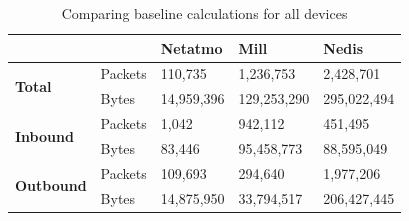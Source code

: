 \begin{table}[H]
    \centering
    \caption{Comparing baseline calculations for all devices}
    \begin{tabular}{ll|l|l|l|}
    \cline{3-5}
                                                         &         & \textbf{Netatmo} & \textbf{Mill} & \textbf{Nedis} \\ \hline
        \multicolumn{1}{|l|}{\multirow{2}{*}{\textbf{Total}}}    & Packets & 110,735          & 1,236,753     & 2,428,701      \\ \cline{2-5} 
        \multicolumn{1}{|l|}{}                                   & Bytes   & 14,959,396       & 129,253,290   & 295,022,494    \\ \hline
        \multicolumn{1}{|l|}{\multirow{2}{*}{\textbf{Inbound}}}  & Packets & 1,042            & 942,112       & 451,495        \\ \cline{2-5} 
        \multicolumn{1}{|l|}{}                                   & Bytes   & 83,446           & 95,458,773    & 88,595,049     \\ \hline
        \multicolumn{1}{|l|}{\multirow{2}{*}{\textbf{Outbound}}} & Packets & 109,693          & 294,640       & 1,977,206      \\ \cline{2-5} 
        \multicolumn{1}{|l|}{}                                   & Bytes   & 14,875,950       & 33,794,517    & 206,427,445    \\ \hline
    \end{tabular}
    \label{tab:ComparingBaselineCalculations}
\end{table}
 
